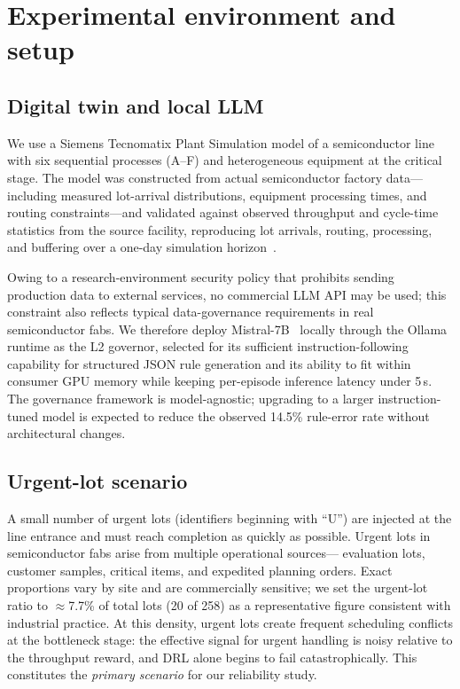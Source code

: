 \documentclass[10pt]{article}
\begin{document}
\section{Experimental environment and setup}
\label{sec:setup}

\subsection{Digital twin and local LLM}
We use a Siemens Tecnomatix Plant Simulation model of a semiconductor line with six
sequential processes (A--F) and heterogeneous equipment at the critical stage.
The model was constructed from actual semiconductor factory data---including
measured lot-arrival distributions, equipment processing times, and routing
constraints---and validated against observed throughput and cycle-time statistics
from the source facility, reproducing lot arrivals, routing, processing, and
buffering over a one-day simulation horizon~\parencite{siemens2023tecnomatix}.

Owing to a research-environment security policy that prohibits sending
production data to external services, no commercial LLM API may be used;
this constraint also reflects typical data-governance requirements in real
semiconductor fabs. We therefore deploy Mistral-7B~\parencite{jiang2023} locally through the Ollama
runtime as the L2 governor, selected for its sufficient instruction-following
capability for structured JSON rule generation and its ability to fit within
consumer GPU memory while keeping per-episode inference latency under 5\,s.
The governance framework is model-agnostic; upgrading to a larger
instruction-tuned model is expected to reduce the observed 14.5\% rule-error
rate without architectural changes.

\subsection{Urgent-lot scenario}
\label{sec:urgentscenario}
A small number of urgent lots (identifiers beginning with ``U'') are injected at
the line entrance and must reach completion as quickly as possible.
Urgent lots in semiconductor fabs arise from multiple operational sources---
evaluation lots, customer samples, critical items, and expedited planning
orders. Exact proportions vary by site and are commercially sensitive; we set
the urgent-lot ratio to $\approx$7.7\% of total lots (20 of 258) as a
representative figure consistent with industrial practice.
At this density, urgent lots create frequent scheduling conflicts at the
bottleneck stage: the effective signal for urgent handling is noisy relative to
the throughput reward, and DRL alone begins to fail catastrophically.
This constitutes the \emph{primary scenario} for our reliability study.
\end{document}
